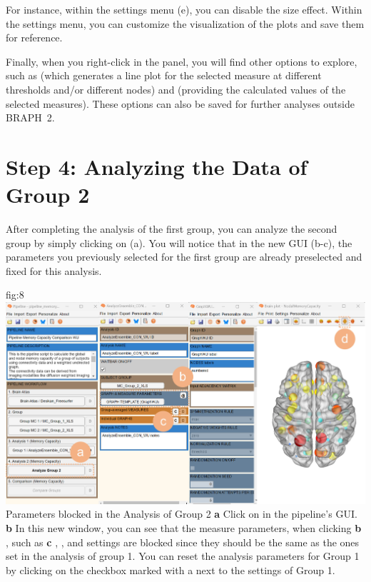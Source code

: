 \documentclass[justified]{tufte-handout}
\begin{document}
For instance, within the settings menu (e), you can disable the size effect. Within the settings menu, you can customize the visualization of the plots and save them for reference.

Finally, when you right-click in the  panel, you will find other options to explore, such as  (which generates a line plot for the selected measure at different thresholds and/or different nodes) and  (providing the calculated values of the selected measures). These options can also be saved for further analyses outside BRAPH~2.



\section{Step 4: Analyzing the Data of Group 2}

After completing the analysis of the first group, you can analyze the second group by simply clicking on  (a). You will notice that in the new GUI (b-c), the parameters you previously selected for the first group are already preselected and fixed for this analysis. 

{fig:8}
{
	\includegraphics{fig08.jpg}
}
{Parameters blocked in the Analysis of Group 2}
{
	{\bf a} Click on  in the pipeline's GUI.
	{\bf b} In this new window, you can see that the measure parameters, when clicking {\bf b} , such as  {\bf c} ,  ,  and  settings are blocked since they should be the same as the ones set in the analysis of group 1. You can reset the analysis parameters for Group 1 by clicking on the checkbox marked with a  next to the settings of Group 1.
}
\end{document}
